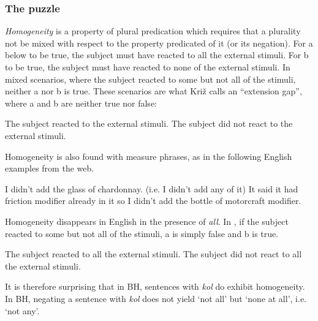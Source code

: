 \documentclass[output=paper]{langsci/langscibook}
\begin{document}
\subsubsection{The puzzle}%

\textit{Homogeneity} is a property of plural predication which requires that a plurality not be mixed with respect to the property predicated of it (or its negation). For a below to be true, the subject must have reacted to all the external stimuli. For b to be true, the subject must have reacted to none of the external stimuli. In mixed scenarios, where the subject reacted to some but not all of the stimuli, neither a nor b is true. These scenarios are what Križ calls an “extension gap”, where a and b are neither true nor false:

\ea%
    \label{ex:doron:26}
\ea The subject reacted to the external stimuli.
\ex The subject did not react to the external stimuli.
\z
\z

Homogeneity is also found with measure phrases, as in the following English examples from the web.

\ea%
    \label{ex:doron:27}
    \ea I didn't add the glass of chardonnay.   (i.e. I didn’t add any of it)
    \ex It said it had friction modifier already in it so I didn't add the bottle of motorcraft modifier.
\z
\z

Homogeneity disappears in English in the presence of \textit{all}. In , if the subject reacted to some but not all of the stimuli, a is simply false and b is true.

\ea%
    \label{ex:doron:28}
    \ea The subject reacted to all the external stimuli.
    \ex The subject did not react to all the external stimuli.
\z
\z

It is therefore surprising that in BH, sentences with \textit{kol} do exhibit homogeneity. In BH, negating a sentence with \textit{kol} does not yield ‘not all’ but ‘none at all’, i.e. ‘not any’.
\end{document}
